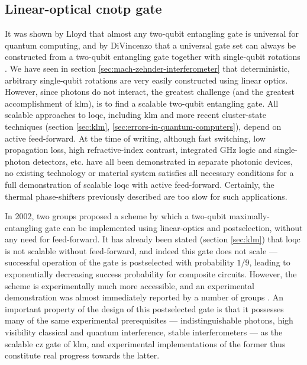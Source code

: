 \subsection{Linear-optical \acrshort{cnotp} gate} 
\label{sec:ralph-cnot}
It was shown by Lloyd \cite{Lloyd1995a} that almost any two-qubit entangling gate is universal for quantum computing, and by DiVincenzo that a universal gate set can always be constructed from a two-qubit entangling gate together with single-qubit rotations \cite{DiVincenzo1995}.
We have seen in section \ref{sec:mach-zehnder-interferometer} that deterministic, arbitrary single-qubit rotations are very easily constructed using linear optics.
However, since photons do not interact, the greatest challenge (and the greatest accomplishment of \gls{klm}), is to find a scalable two-qubit entangling gate.  All scalable approaches to \gls{loqc}, including \gls{klm} and more recent cluster-state techniques (section \ref{sec:klm}, \ref{sec:errors-in-quantum-computers}), depend on active feed-forward. At the time of writing, although fast switching, low propagation loss, high refractive-index contrast, integrated \si{\giga \hertz} logic and single-photon detectors, etc. have all been demonstrated in separate photonic devices, no existing technology or material system satisfies all necessary conditions for a full demonstration of scalable \gls{loqc} with active feed-forward. Certainly, the thermal phase-shifters previously described are too slow for such applications.

In 2002, two groups \cite{Ralph2002, Hofmann2002} proposed a scheme by which a two-qubit maximally-entangling gate can be implemented using linear-optics and postselection, without any need for feed-forward. It has already been stated (section \ref{sec:klm}) that \gls{loqc} is not scalable without feed-forward, and indeed this gate does not scale --- successful operation of the gate is postselected with probability $1/9$, leading to exponentially decreasing success probability for composite circuits. However, the scheme is experimentally much more accessible, and an experimental demonstration was almost immediately reported  by a number of groups \cite{Franson2002, Pittman2002, OBrien2003, Gasparoni2004}.
An important property of the design of this postselected gate is that it possesses many of the same experimental prerequisites --- indistinguishable photons, high visibility classical and quantum interference, stable interferometers --- as the scalable \gls{cz} gate of \gls{klm}, and experimental implementations of the former thus constitute real progress towards the latter.

